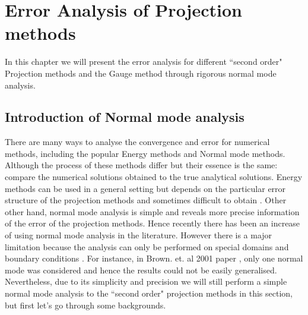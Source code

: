 
\chapter{Error Analysis of Projection methods}
\label{chapter5}
In this chapter we will present the error analysis for different ``second order" Projection methods and the Gauge method through rigorous normal mode analysis.

\section{Introduction of Normal mode analysis}

There are many ways to analyse the convergence and error for numerical methods, including the popular Energy methods \cite{liu1996projection,guermond2006overview} and Normal mode methods. Although the process of these methods differ but their essence is the same: compare the numerical solutions obtained to the true analytical solutions\cite{pyo2005normal,guermond2004error}. Energy methods can be used in a general setting but depends on the particular error structure of the projection methods and sometimes difficult to obtain \cite{guermond2006overview}. Other other hand, normal mode analysis is simple and reveals more precise information of the error of the projection methods. Hence recently there has been an increase of using normal mode analysis in the literature. However there is a major limitation because the analysis can only be performed on special domains and boundary conditions \cite{strikwerda1999accuracy,pyo2005normal,brown2001accurate}. For instance, in Brown. et. al 2001 paper \cite{brown2001accurate}, only one normal mode was considered and hence the results could not be easily generalised.\\
Nevertheless, due to its simplicity and precision we will still perform a simple normal mode analysis to the ``second order" projection methods in this section, but first let's go through some backgrounds.\\

